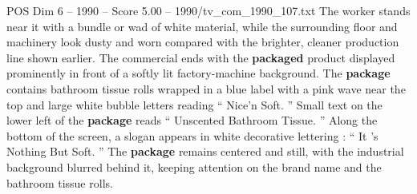 \begin{textsample}{POS Dim 6 – 1990 – Score 5.00 – 1990/tv\_com\_1990\_107.txt}
The worker stands near it with a bundle or wad of white material, while the surrounding floor and machinery look dusty and worn compared with the brighter, cleaner production line shown earlier.
The commercial ends with the \textbf{packaged} product displayed prominently in front of a softly lit factory-machine background.
The \textbf{package} contains bathroom tissue rolls wrapped in a blue label with a pink wave near the top and large white bubble letters reading “ Nice’n Soft. ” Small text on the lower left of the \textbf{package} reads “ Unscented Bathroom Tissue. ” Along the bottom of the screen, a slogan appears in white decorative lettering : “ It ’s Nothing But Soft. ” The \textbf{package} remains centered and still, with the industrial background blurred behind it, keeping attention on the brand name and the bathroom tissue rolls.

\end{textsample}
